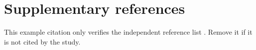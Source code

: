 \documentclass[11pt,a4paper]{article}
\begin{document}
\FloatBarrier
\section{Supplementary references}
This example citation only verifies the independent reference list
\citep{wilkinson2016fair}. Remove it if it is not cited by the study.
\renewcommand{\bibsection}{} %


\end{document}
